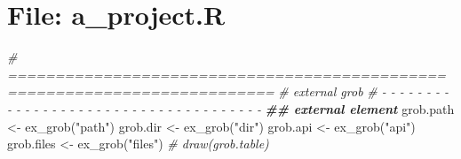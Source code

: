 \documentclass[
]{article}
\newenvironment{Shaded}{\begin{snugshade}}{\end{snugshade}}
\newcommand{\CommentTok}[1]{\textcolor[rgb]{0.56,0.35,0.01}{\textit{#1}}}
\newcommand{\DocumentationTok}[1]{\textcolor[rgb]{0.56,0.35,0.01}{\textbf{\textit{#1}}}}
\newcommand{\FunctionTok}[1]{\textcolor[rgb]{0.00,0.00,0.00}{#1}}
\newcommand{\NormalTok}[1]{#1}
\newcommand{\OtherTok}[1]{\textcolor[rgb]{0.56,0.35,0.01}{#1}}
\newcommand{\StringTok}[1]{\textcolor[rgb]{0.31,0.60,0.02}{#1}}
\begin{document}
\hypertarget{file-a_project.r-1}{%
\section{File: a\_project.R}\label{file-a_project.r-1}}

\begin{Shaded}
\begin{Highlighting}[]
\CommentTok{\# ==========================================================================}
\CommentTok{\# external grob}
\CommentTok{\# {-} {-} {-} {-} {-} {-} {-} {-} {-} {-} {-} {-} {-} {-} {-} {-} {-} {-} {-} {-} {-} {-} {-} {-} {-} {-} {-} {-} {-} {-} {-} {-} {-} {-} {-} {-} {-}}
\DocumentationTok{\#\# external element}
\NormalTok{grob.path }\OtherTok{\textless{}{-}} \FunctionTok{ex\_grob}\NormalTok{(}\StringTok{"path"}\NormalTok{)}
\NormalTok{grob.dir }\OtherTok{\textless{}{-}} \FunctionTok{ex\_grob}\NormalTok{(}\StringTok{"dir"}\NormalTok{)}
\NormalTok{grob.api }\OtherTok{\textless{}{-}} \FunctionTok{ex\_grob}\NormalTok{(}\StringTok{"api"}\NormalTok{)}
\NormalTok{grob.files }\OtherTok{\textless{}{-}} \FunctionTok{ex\_grob}\NormalTok{(}\StringTok{"files"}\NormalTok{)}
\CommentTok{\# draw(grob.table)}
\end{Highlighting}
\end{Shaded}
\end{document}
